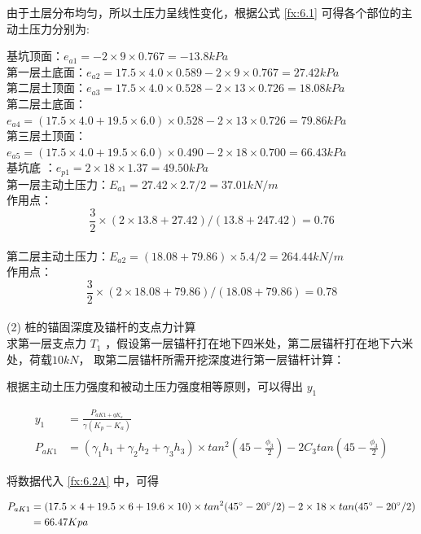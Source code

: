 由于土层分布均匀，所以土压力呈线性变化，根据公式 \ref{fx:6.1} 可得各个部位的主动土压力分别为:

基坑顶面：$e_{a1}=-2×9×0.767=-13.8 kPa$\\

第一层土底面：$e_{a2}=17.5×4.0×0.589-2×9×0.767=27.42 kPa $\\

第二层土顶面：$e_{a3}=17.5×4.0×0.528-2×13×0.726=18.08 kPa$\\

第二层土底面：$e_{a4}=(17.5×4.0+19.5×6.0)×0.528-2×13×0.726=79.86 kPa$\\

第三层土顶面：$e_{a5}=(17.5×4.0+19.5×6.0)×0.490-2×18×0.700=66.43 kPa$\\

基坑底 ：$e_{p1}=2×18×1.37=49.50kPa $\\

第一层主动土压力：$E_{a1}=27.42×2.7/2=37.01kN/m $\\

作用点：\[\frac{3}{2}\times(2\times 13.8+27.42)/(13.8+247.42)=0.76\]\\

第二层主动土压力：$E_{a2}=(18.08+79.86)×5.4/2=264.44kN/m$\\

作用点：\[\frac{3}{2}\times(2\times 18.08+79.86)/(18.08+79.86)=0.78\]\\

(2) 桩的锚固深度及锚杆的支点力计算\\

求第一层支点力 $T_1$ ，假设第一层锚杆打在地下四米处，第二层锚杆打在地下六米处，荷载$ 10 kN$，
取第二层锚杆所需开挖深度进行第一层锚杆计算：

根据主动土压力强度和被动土压力强度相等原则，可以得出 $y_1$

\begin{align}
    \label{fx:6.2}
    y_1&=\frac{P_{aK1+qK_a}}{\gamma (K_p-K_a)}\\
    \label{fx:6.2A}
    P_{aK1}&=(\gamma_1h_1+\gamma_2h_2+\gamma_3h_3)\times tan^2(45-\frac{\phi_3}{2})-2C_3tan(45-\frac{\phi_3}{2})
\end{align}

将数据代入 \ref{fx:6.2A} 中，可得

\begin{align*}
P_{aK1}&=(17.5\times 4+19.5\times 6+19.6\times 10)\times tan^2(45^{\circ} -20^{\circ} /2)-2\times 18\times tan(45^{\circ} -20^{\circ} /2)\\
&=66.47 Kpa
\end{align*}

